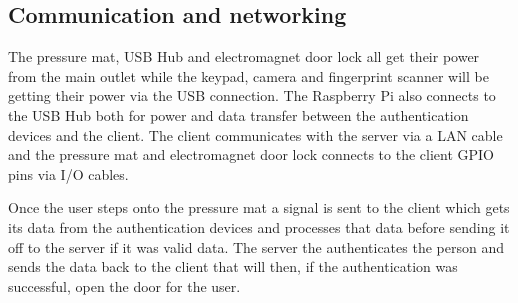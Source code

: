 \subsection{Communication and networking}
The pressure mat, USB Hub and electromagnet door lock all get their power from the main outlet while the keypad, camera and fingerprint scanner will be getting their power via the USB connection. The Raspberry Pi also connects to the USB Hub both for power and data transfer between the authentication devices and the client. The client communicates with the server via a LAN cable and the pressure mat and electromagnet door lock connects to the client GPIO pins via I/O cables. 

Once the user steps onto the pressure mat a signal is sent to the client which gets its data from the authentication devices and processes that data before sending it off to the server if it was valid data. The server the authenticates the person and sends the data back to the client that will then, if the authentication was successful, open the door for the user.